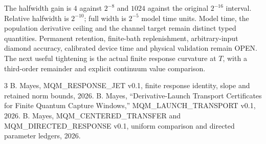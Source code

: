 \documentclass[a4paper,journal]{IEEEtran}
\begin{document}
The halfwidth gain is $4$ against $2^{-8}$ and $1024$ against the original $2^{-16}$ interval. Relative halfwidth is $2^{-10}$; full width is $2^{-5}$ model time units. Model time, the population derivative ceiling and the channel target remain distinct typed quantities. Permanent retention, finite-bath replenishment, arbitrary-input diamond accuracy, calibrated device time and physical validation remain OPEN. The next useful tightening is the actual finite response curvature at $T$, with a third-order remainder and explicit continuum value comparison.
\begin{thebibliography}{3}
 B. Mayes, MQM\_RESPONSE\_JET v0.1, finite response identity, slope and retained norm bounds, 2026.
 B. Mayes, ``Derivative-Launch Transport Certificates for Finite Quantum Capture Windows,'' MQM\_LAUNCH\_TRANSPORT v0.1, 2026.
 B. Mayes, MQM\_CENTERED\_TRANSFER and MQM\_DIRECTED\_RESPONSE v0.1, uniform comparison and directed parameter ledgers, 2026.
\end{thebibliography}
\end{document}

